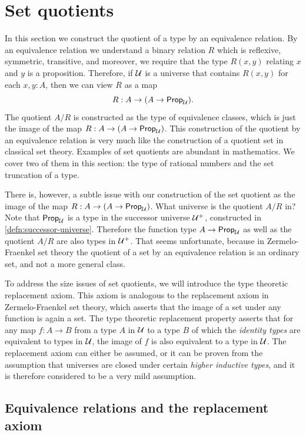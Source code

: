 \section{Set quotients}\label{sec:set-quotients}

In this section we construct the quotient of a type by an equivalence relation. By an equivalence relation we understand a binary relation $R$ which is reflexive, symmetric, transitive, and moreover, we require that the type $R(x,y)$ relating $x$ and $y$ is a proposition. Therefore, if $\mathcal{U}$ is a universe that contains $R(x,y)$ for each $x,y:A$, then we can view $R$ as a map
\begin{equation*}
  R:A\to(A\to\mathsf{Prop}_{\mathcal{U}}).
\end{equation*}
The quotient $A/R$ is constructed as the type of equivalence classes, which is just the image of the map $R:A\to (A\to\mathsf{Prop}_{\mathcal{U}})$. This construction of the quotient by an equivalence relation is very much like the construction of a quotient set in classical set theory. Examples of set quotients are abundant in mathematics. We cover two of them in this section: the type of rational numbers and the set truncation of a type.

There is, however, a subtle issue with our construction of the set quotient as the image of the map $R:A\to(A\to\mathsf{Prop}_{\mathcal{U}})$. What universe is the quotient $A/R$ in? Note that $\mathsf{Prop}_{\mathcal{U}}$ is a type in the successor universe $\mathcal{U}^+$, constructed in \cref{defn:successor-universe}. Therefore the function type $A\to \mathsf{Prop}_{\mathcal{U}}$ as well as the quotient $A/R$ are also types in $\mathcal{U}^+$. That seems unfortunate, because in Zermelo-Fraenkel set theory the quotient of a set by an equivalence relation is an ordinary set, and not a more general class.

To address the size issues of set quotients, we will introduce the type theoretic replacement axiom. This axiom is analogous to the replacement axiom in Zermelo-Fraenkel set theory, which asserts that the image of a set under any function is again a set. The type theoretic replacement property asserts that for any map $f:A\to B$ from a type $A$ in $\mathcal{U}$ to a type $B$ of which the \emph{identity types} are equivalent to types in $\mathcal{U}$, the image of $f$ is also equivalent to a type in $\mathcal{U}$. The replacement axiom can either be assumed, or it can be proven from the assumption that universes are closed under certain \emph{higher inductive types}, and it is therefore considered to be a very mild assumption.

\subsection{Equivalence relations and the replacement axiom}

